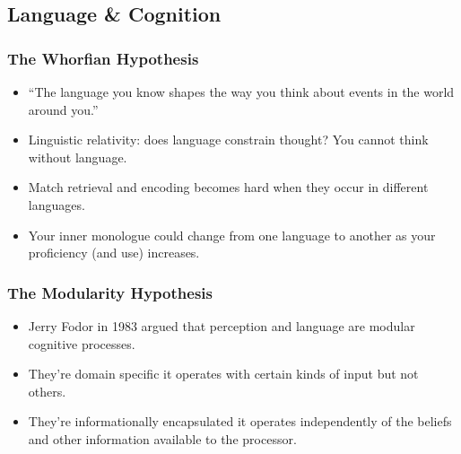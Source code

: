 \documentclass[]{article}
\begin{document}
		\subsection{Language \& Cognition}
			\subsubsection{The Whorfian Hypothesis}
				\begin{itemize}
					\item ``The language you know shapes the way you think about events in the world around you.''
					\item Linguistic relativity: does language constrain thought? You cannot think without language.
					\item Match retrieval and encoding becomes hard when they occur in different languages.
					\item Your inner monologue could change from one language to another as your proficiency (and use) increases.
				\end{itemize}

			\subsubsection{The Modularity Hypothesis}
				\begin{itemize}
					\item Jerry Fodor in 1983 argued that perception and language are modular cognitive processes.
					\item They're domain specific \textendash{} it operates with certain kinds of input but not others.
					\item They're informationally encapsulated \textendash{} it operates independently of the beliefs and other information available to the processor.
				\end{itemize}
\end{document}

